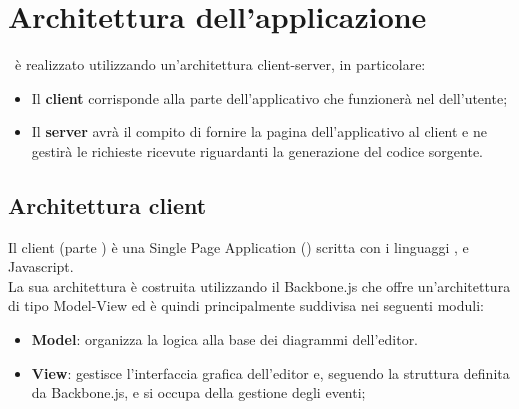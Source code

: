 \documentclass[../DefinizioneDiProdotto.tex]{subfiles}
\begin{document}
		\section{Architettura dell'applicazione}
			\progetto\ è realizzato utilizzando un'architettura client-server, in particolare:
			\begin{itemize}
				\item Il \textbf{client} corrisponde alla parte dell'applicativo che funzionerà nel
				 dell'utente;
				\item Il \textbf{server} avrà il compito di fornire la pagina dell'applicativo al client
				e ne gestirà le richieste ricevute riguardanti la generazione del codice sorgente.
			\end{itemize}
			\subsection{Architettura client}
				Il client (parte ) è una Single Page Application () scritta con i linguaggi
				,  e Javascript.\\
				La sua architettura è costruita utilizzando il  Backbone.js che offre
				un'architettura di tipo Model-View ed è quindi principalmente suddivisa nei seguenti moduli:
				\begin{itemize}
					\item \textbf{Model}: organizza la logica alla base dei diagrammi dell'editor.
					\item \textbf{View}: gestisce l'interfaccia grafica dell'editor e, seguendo la struttura
					definita da Backbone.js, e si occupa della gestione
					degli eventi; 
				\end{itemize}
\end{document}
